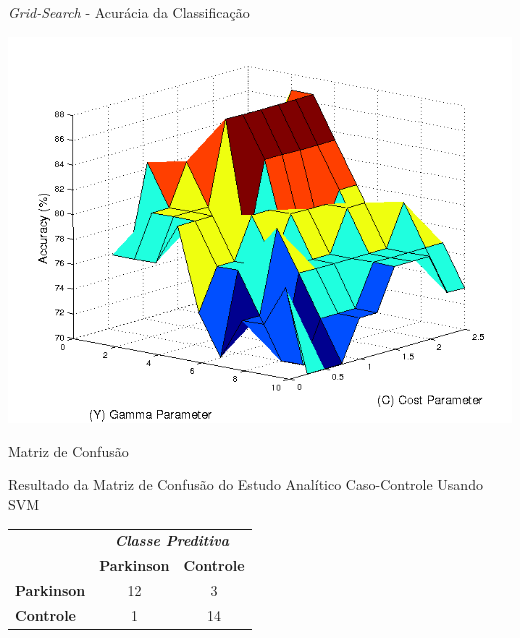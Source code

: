\documentclass{beamer}
\begin{document}
\begin{frame}{\textit{Grid-Search} - Acurácia da Classificação}
  \begin{block}{}
  \center  
      \includegraphics[scale=0.4]{./img/gridsearch.png}      
  \end{block}
\end{frame}


\begin{frame}{Matriz de Confusão}
	\begin{block}{Resultado da Matriz de Confusão do Estudo Analítico Caso-Controle Usando SVM}
\begin{table}[!htbp]
		\label{table:resultadomatrizconfusaosvm}
		\centering
		\begin{tabular}{l|c|c|}
		\cline{2-3}
		\multicolumn{1}{c}{}                         & \multicolumn{2}{|c|}{\textit{\textbf{Classe Preditiva}}} \\ \cline{2-3} 
																								 & \textbf{Parkinson}      & \textbf{Controle}         \\ \hline
		\multicolumn{1}{|l|}{\textbf{Parkinson}} & 12       & 3           \\ \hline
		\multicolumn{1}{|l|}{\textbf{Controle}}     & 1           & 14     \\ \hline
		\end{tabular}
\end{table}
	\end{block}
\end{frame}
\end{document}

